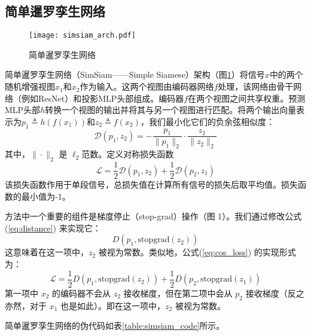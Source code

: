 \documentclass[master]{thesis-uestc}
\begin{document}
\subsection{简单暹罗孪生网络}
\begin{figure}[h]
    \texttt{[image: simsiam\_arch.pdf]}
    \caption{简单暹罗孪生网络}
    \label{simsiam_arch}
\end{figure}
简单暹罗孪生网络（SimSiam——Simple Siamese）架构（图\ref{simsiam_arch}）将信号$x$中的两个随机增强视图$x_1$和$x_2$作为输入。这两个视图由编码器网络$f$处理，该网络由骨干网络（例如ResNet）和投影MLP头部组成。编码器$f$在两个视图之间共享权重。预测MLP头部$h$转换一个视图的输出并将其与另一个视图进行匹配。将两个输出向量表示为$p_1 \triangleq h(f(x_1))$和$z_2 \triangleq f(x_2)$，我们最小化它们的负余弦相似度：
\begin{equation}
    \mathcal{D}(p_1, z_2) = -\frac{p_1}{\|p_1\|_2} \cdot \frac{z_2}{\|z_2\|_2}
    \label{eq:distance}
\end{equation}  
其中，$\|\cdot\|_2$ 是 $\ell_2$范数。定义对称损失函数
\begin{equation}
    \mathcal{L} = \frac{1}{2} \mathcal{D}(p_{1}, z_{2}) + \frac{1}{2} \mathcal{D}(p_{2}, z_{1})
\label{eq:cos_loss}
\end{equation}
该损失函数作用于单段信号，总损失值在计算所有信号的损失后取平均值。损失函数的最小值为-1。

方法中一个重要的组件是梯度停止（stop-grad）操作（图 1）。我们通过修改公式(\ref{eq:distance}) 来实现它：
\begin{equation}
    D(p_1, \text{stopgrad}(z_2))
\label{eq:stopgrad}
\end{equation}
这意味着在这一项中，\( z_2 \) 被视为常数。类似地，公式(\ref{eq:cos_loss}) 的实现形式为：
\begin{equation}
\mathcal{L} = \frac{1}{2} D(p_1, \text{stopgrad}(z_2)) + \frac{1}{2} D(p_2, \text{stopgrad}(z_1))
\label{eq:cos_loss_stopgrad}
\end{equation}
第一项中 \( x_2 \) 的编码器不会从 \( z_2 \) 接收梯度，但在第二项中会从 \( p_2 \) 接收梯度（反之亦然，对于 \( x_1 \) 也是如此）。即在这一项中，\( z_2 \) 被视为常数。

简单暹罗孪生网络的伪代码如表\ref{table:simsiam_code}所示。
\end{document}
